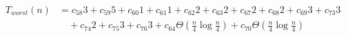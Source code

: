\begin{align}
\label{eq:analyse-checksquare-case3}
T_{worst}(n)& =
c_{58}3 + c_{59}5 + c_{60}1 + c_{61}1 + c_{62}2 + c_{63}2 + c_{67}2 + c_{68}2 + c_{69}3 + c_{73}3
\\
& \quad
+ c_{74}2 + c_{75}3 + c_{76}3
+ c_{64}\Theta(\frac{n}{4} \log \frac{n}{4})
+ c_{70}\Theta(\frac{n}{4} \log \frac{n}{4})
\nonumber
\end{align}
